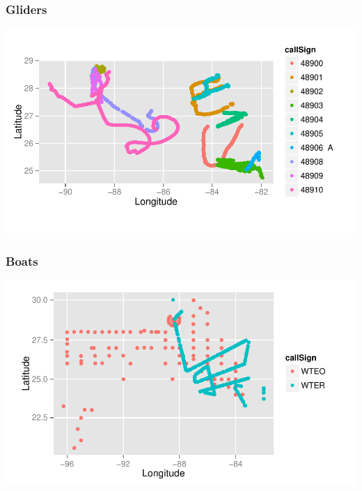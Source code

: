 \documentclass{beamer}\usepackage[]{graphicx}\usepackage[]{color}
\newenvironment{knitrout}{}{} %
\begin{document}

\begin{frame}[fragile]
\frametitle{Gliders}

\begin{knitrout}\footnotesize
{}\color{fgcolor}

{\centering \includegraphics[width=.9\linewidth]{figure/gliders} 

}



\end{knitrout}
\end{frame}



\begin{frame}[fragile]
\frametitle{Boats}

\begin{knitrout}\footnotesize
{}\color{fgcolor}

{\centering \includegraphics[width=.9\linewidth]{figure/Boats} 

}



\end{knitrout}

\end{frame}
\end{document}
